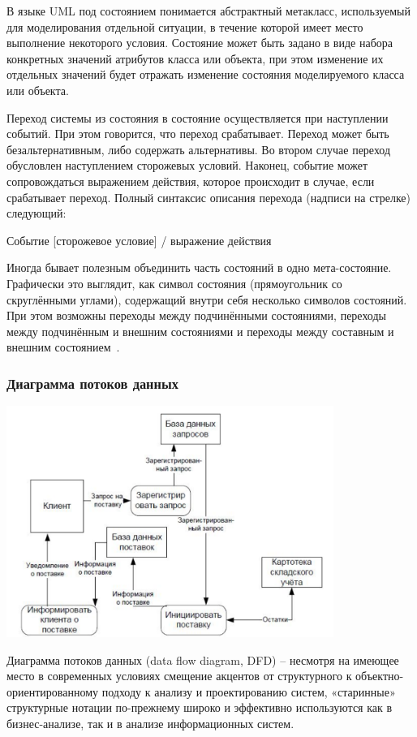 \documentclass{../industrial-development}
\begin{document}
В языке UML под состоянием понимается абстрактный метакласс, используемый
для моделирования отдельной ситуации, в течение которой имеет место выполнение
некоторого условия. Состояние может быть задано в виде набора конкретных
значений атрибутов класса или объекта, при этом изменение их отдельных значений будет
отражать изменение состояния моделируемого класса или объекта.

Переход системы из состояния в состояние осуществляется при наступлении
событий. При этом говорится, что переход срабатывает. Переход может быть
безальтернативным, либо содержать альтернативы. Во втором случае переход обусловлен
наступлением сторожевых условий. Наконец, событие может сопровождаться
выражением действия, которое происходит в случае, если срабатывает переход. Полный
синтаксис описания перехода (надписи на стрелке) следующий:

\alert{Событие [сторожевое условие] / выражение действия}

Иногда бывает полезным объединить часть состояний в одно мета-состояние.
Графически это выглядит, как символ состояния (прямоугольник со скруглёнными
углами), содержащий внутри себя несколько символов состояний. При этом возможны
переходы между подчинёнными состояниями, переходы между подчинённым и внешним
состояниями и переходы между составным и внешним состоянием~\cite[с.~48-49]{Maglinec}.

\begin{frame} \frametitle {Диаграмма потоков данных}
 \centerline{\includegraphics[width=0.8\textwidth]{pict7.pdf}}
\end{frame}

\lecturenotes

\alert{Диаграмма потоков данных} (data flow diagram, DFD) – несмотря на имеющее место в современных условиях смещение акцентов от структурного к объектно-ориентированному подходу к
анализу и проектированию систем, «старинные» структурные нотации по-прежнему
широко и эффективно используются как в бизнес-анализе, так и в анализе
информационных систем.
\end{document}
